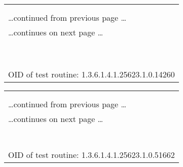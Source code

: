 \documentclass{article}
\begin{document}
\begin{longtable}{|p{}|}
\hline
\rowcolor{openvas_log}{\color{white}{Log (CVSS: 0.0) }}\\
\rowcolor{openvas_log}{\color{white}{NVT: Nikto (NASL wrapper)}}\\
\hline
\endfirsthead
\hfill\ldots continued from previous page \ldots \\
\hline
\endhead
\hline
\ldots continues on next page \ldots \\
\endfoot
\hline
\endlastfoot
\\
\rowcolor{white}{\verb=Nikto could not be found in your system path.=}\\
\rowcolor{white}{\verb=OpenVAS was unable to execute Nikto and to perform the scan you=}\\
\rowcolor{white}{\verb=requested.=}\\
\rowcolor{white}{\verb=Please make sure that Nikto is installed and that nikto.pl or nikto is=}\\
\rowcolor{white}{\verb=available in the PATH variable defined for your environment.=}\\
\rowcolor{white}{\verb==}\\
\rowcolor{white}{\verb==}\\
\\
OID of test routine: 1.3.6.1.4.1.25623.1.0.14260\\
\end{longtable}

\begin{longtable}{|p{}|}
\hline
\rowcolor{openvas_log}{\color{white}{Log (CVSS: 0.0) }}\\
\rowcolor{openvas_log}{\color{white}{NVT: Traceroute}}\\
\hline
\endfirsthead
\hfill\ldots continued from previous page \ldots \\
\hline
\endhead
\hline
\ldots continues on next page \ldots \\
\endfoot
\hline
\endlastfoot
\\
\rowcolor{white}{\verb=Here is the route from 192.168.1.1 to 192.168.1.10:=}\\
\rowcolor{white}{\verb=192.168.1.1=}\\
\rowcolor{white}{\verb=192.168.1.10=}\\
\rowcolor{white}{\verb==}\\
\rowcolor{white}{\verb==}\\
\\
OID of test routine: 1.3.6.1.4.1.25623.1.0.51662\\
\end{longtable}
\end{document}
